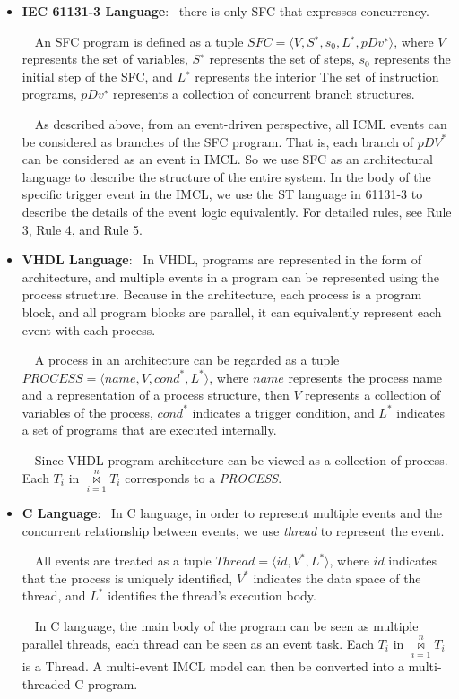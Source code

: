 \begin{itemize}
  \item \textbf{IEC 61131-3 Language}: \ there is only SFC that expresses concurrency.

      \ \ An SFC program is defined as a tuple $SFC = \langle V, S^{∗}, s_{0}, L^{∗}, pDv^{∗} \rangle$, where $V$ represents the set of variables, $S^{∗}$ represents the set of steps, $s_0$ represents the initial step of the SFC, and $L^{∗}$ represents the interior The set of instruction programs, $pDv^{∗}$ represents a collection of concurrent branch structures.

      \ \ As described above, from an event-driven perspective, all ICML events can be considered as branches of the SFC program. That is, each branch of $pDV^*$ can be considered as an event in IMCL. So we use SFC as an architectural language to describe the structure of the entire system. In the body of the specific trigger event in the IMCL, we use the ST language in 61131-3 to describe the details of the event logic equivalently. For detailed rules, see Rule 3, Rule 4, and Rule 5.
  \item \textbf{VHDL Language}: \ In VHDL, programs are represented in the form of architecture, and multiple events in a program can be represented using the process structure. Because in the architecture, each process is a program block, and all program blocks are parallel, it can equivalently represent each event with each process.

      \ \ A process in an architecture can be regarded as a tuple $PROCESS = \langle name, V, cond^{*}, L^{*} \rangle$, where $name$ represents the process name and a representation of a process structure, then $V$ represents a collection of variables of the process, $cond^{*}$ indicates a trigger condition, and $L^{*}$ indicates a set of programs that are executed internally.

      \ \ Since VHDL program architecture can be viewed as a collection of process. Each $T_i$ in $\overset{n}{\underset{i=1}{\bowtie}} T_{i}$ corresponds to a \emph{PROCESS}.
  \item \textbf{C Language}: \ In C language, in order to represent multiple events and the concurrent relationship between events, we use \emph{thread} to represent the event.

      \ \ All events are treated as a tuple $Thread = \langle id, V^*, L^* \rangle$, where $id$ indicates that the process is uniquely identified, $V^*$ indicates the data space of the thread, and $L^*$ identifies the thread's execution body.

      \ \ In C language, the main body of the program can be seen as multiple parallel threads, each thread can be seen as an event task. Each $T_i$ in $\overset{n}{\underset{i=1}{\bowtie}} T_{i}$ is a Thread. A multi-event IMCL model can then be converted into a multi-threaded C program.
\end{itemize}

